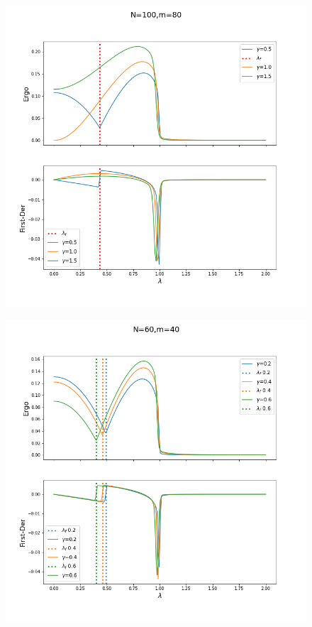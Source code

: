 \documentclass[12pt,a4paper]{book}
\theoremstyle{definition}
\begin{document}
\begin{figure}[h]
	\centering
	\includegraphics[width=0.7\linewidth]{graphs/N100_m80_simbreak_g_051015}
	\caption{}
	\label{fig:n100m80simbreakg051015}
\end{figure}

\begin{figure}[h]
	\centering
	\includegraphics[width=0.7\linewidth]{graphs/N60_m40_simbreak_g_020406}
	\caption{}
	\label{fig:n60m40simbreakg020406}
\end{figure}
\end{document}
